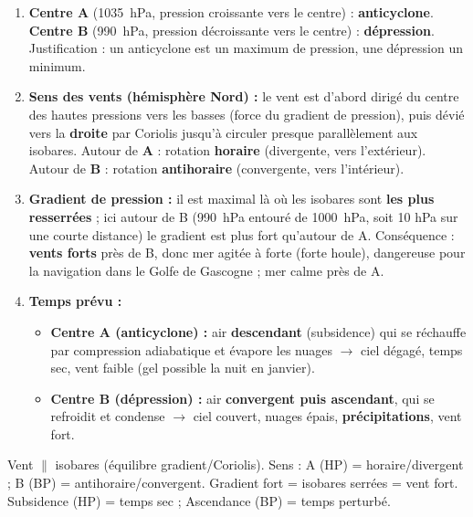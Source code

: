 \documentclass[11pt]{article}
\begin{document}
\begin{corrige}
\begin{enumerate}
    \item \textbf{Centre A} (\SI{1035}{\hecto\pascal}, pression croissante vers le centre) : \textbf{anticyclone}. \textbf{Centre B} (\SI{990}{\hecto\pascal}, pression décroissante vers le centre) : \textbf{dépression}. Justification : un anticyclone est un maximum de pression, une dépression un minimum.
    \item \textbf{Sens des vents (hémisphère Nord) :} le vent est d'abord dirigé du centre des hautes pressions vers les basses (force du gradient de pression), puis dévié vers la \textbf{droite} par Coriolis jusqu'à circuler presque parallèlement aux isobares. Autour de \textbf{A} : rotation \textbf{horaire} (divergente, vers l'extérieur). Autour de \textbf{B} : rotation \textbf{antihoraire} (convergente, vers l'intérieur).
    \item \textbf{Gradient de pression :} il est maximal là où les isobares sont \textbf{les plus resserrées} ; ici autour de B (\SI{990}{\hecto\pascal} entouré de \SI{1000}{\hecto\pascal}, soit 10 hPa sur une courte distance) le gradient est plus fort qu'autour de A. Conséquence : \textbf{vents forts} près de B, donc mer agitée à forte (forte houle), dangereuse pour la navigation dans le Golfe de Gascogne ; mer calme près de A.
    \item \textbf{Temps prévu :}
    \begin{itemize}
        \item \textbf{Centre A (anticyclone) :} air \textbf{descendant} (subsidence) qui se réchauffe par compression adiabatique et évapore les nuages $\rightarrow$ ciel dégagé, temps sec, vent faible (gel possible la nuit en janvier).
        \item \textbf{Centre B (dépression) :} air \textbf{convergent puis ascendant}, qui se refroidit et condense $\rightarrow$ ciel couvert, nuages épais, \textbf{précipitations}, vent fort.
    \end{itemize}
\end{enumerate}
\end{corrige}

\begin{attention}
Vent $\parallel$ isobares (équilibre gradient/Coriolis). Sens : A (HP) = horaire/divergent ; B (BP) = antihoraire/convergent. Gradient fort = isobares serrées = vent fort. Subsidence (HP) = temps sec ; Ascendance (BP) = temps perturbé.
\end{attention}
\end{document}
